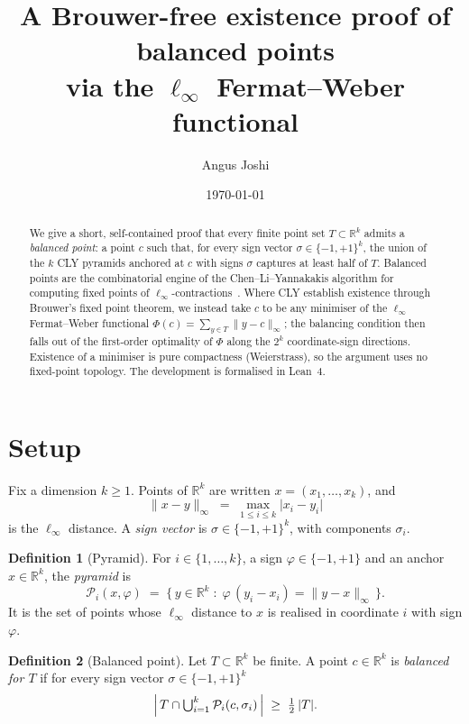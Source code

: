 \documentclass[11pt]{article}
\title{A Brouwer-free existence proof of balanced points\\
\large via the $\ell_\infty$ Fermat--Weber functional}
\author{Angus Joshi}
\date{\today}
\theoremstyle{plain}
\theoremstyle{definition}
\newtheorem{definition}{Definition}
\theoremstyle{remark}
\newcommand{\R}{\mathbb{R}}
\newcommand{\Rk}{\R^{k}}
\newcommand{\linf}[1]{\lVert #1 \rVert_{\infty}}
\newcommand{\abs}[1]{\lvert #1 \rvert}
\newcommand{\card}[1]{\lvert #1 \rvert}
\newcommand{\Pyr}{\mathcal{P}}
\newcommand{\sgn}{\sigma}
\newcommand{\FW}{\Phi}
\begin{document}
\maketitle

\begin{abstract}
We give a short, self-contained proof that every finite point set
$T\subset\Rk$ admits a \emph{balanced point}: a point $c$ such that, for every
sign vector $\sgn\in\{-1,+1\}^k$, the union of the $k$ CLY pyramids anchored at
$c$ with signs $\sgn$ captures at least half of $T$. Balanced points are the
combinatorial engine of the Chen--Li--Yannakakis algorithm for computing
fixed points of $\ell_\infty$-contractions~\cite{CLY24}. Where CLY establish
existence through Brouwer's fixed point theorem, we instead take $c$ to be any
minimiser of the $\ell_\infty$ Fermat--Weber functional
$\FW(c)=\sum_{y\in T}\linf{y-c}$; the balancing condition then falls out of the
first-order optimality of $\FW$ along the $2^k$ coordinate-sign directions.
Existence of a minimiser is pure compactness (Weierstrass), so the argument
uses no fixed-point topology. The development is formalised in Lean~4.
\end{abstract}

\section{Setup}

Fix a dimension $k\ge 1$. Points of $\Rk$ are written $x=(x_1,\dots,x_k)$, and
\[
  \linf{x-y}\;=\;\max_{1\le i\le k}\abs{x_i-y_i}
\]
is the $\ell_\infty$ distance. A \emph{sign vector} is $\sgn\in\{-1,+1\}^k$,
with components $\sgn_i$.

\begin{definition}[Pyramid]\label{def:pyramid}
For $i\in\{1,\dots,k\}$, a sign $\varphi\in\{-1,+1\}$ and an anchor $x\in\Rk$,
the \emph{pyramid} is
\[
  \Pyr_i(x,\varphi)\;=\;\bigl\{\,y\in\Rk \;:\; \varphi\,(y_i-x_i)=\linf{y-x}\,\bigr\}.
\]
It is the set of points whose $\ell_\infty$ distance to $x$ is realised in
coordinate $i$ with sign $\varphi$.
\end{definition}

\begin{definition}[Balanced point]\label{def:balanced}
Let $T\subset\Rk$ be finite. A point $c\in\Rk$ is \emph{balanced for $T$} if for
every sign vector $\sgn\in\{-1,+1\}^k$
\[
  \Bigl\lvert\, T\cap \textstyle\bigcup_{i=1}^{k}\Pyr_i(c,\sgn_i)\,\Bigr\rvert
  \;\ge\; \tfrac12\,\card{T}.
\]
\end{definition}
\end{document}
